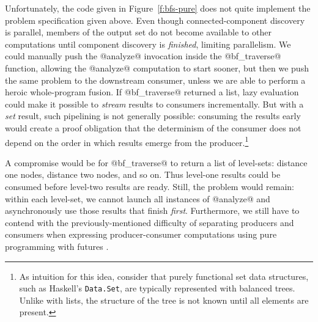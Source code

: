 Unfortunately, the code given in Figure~\ref{f:bfs-pure} does not
quite implement the problem specification given above.
Even though connected-component discovery is
  parallel, members of the output set do not become available to other computations until component discovery is {\em
    finished}, limiting parallelism.  We could manually push the @analyze@
  invocation inside the @bf_traverse@
  function,
  allowing the @analyze@ computation to start sooner, but then we push
  the same problem to the downstream consumer, unless we are able to perform a
  heroic whole-program fusion.
%
%
If @bf_traverse@ returned a list, lazy evaluation could
  make it possible to {\em stream} results to consumers
  incrementally.  But with a {\em set} result, such pipelining is not generally possible:
  consuming the results early would create a proof obligation that the
  determinism of the consumer does not depend on the order in which results
  emerge from the producer.\footnote{As intuition for this idea, consider that purely functional set data
    structures, such as Haskell's \lstinline|Data.Set|, are typically represented with
    balanced trees.  Unlike with
    lists, the structure of the tree is not known until all elements are present.  
    }

A compromise would be for @bf_traverse@ to return a list of level-sets:
  distance one nodes, distance two nodes, and so on.  Thus level-one results could
  be consumed before level-two results are ready.  Still, the problem would remain: within
  each level-set, we cannot launch all instances of @analyze@ and
  asynchronously use those results that finish {\em first}.
%
Furthermore, we still have to contend with the previously-mentioned
difficulty of separating producers and consumers when expressing
producer-consumer computations using pure programming with futures
\cite{monad-par}.



